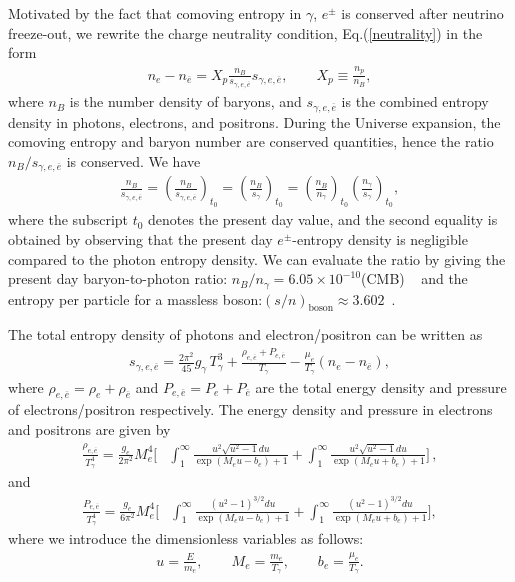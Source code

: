 Motivated by the fact that comoving entropy in $\gamma$, $e^\pm$ is conserved after neutrino freeze-out, we rewrite the charge neutrality condition, Eq.(\ref{neutrality}) in the form
\begin{align}\label{charge_neutral_cond2}
n_e-n_{\overline{e}}=X_p\frac{n_B}{s_{\gamma,e,\overline{e}}} s_{\gamma,e,\overline{e}},\qquad X_p\equiv\frac{n_p}{n_B},
\end{align}
where $n_B$ is the number density of baryons, and $s_{\gamma,e,\overline{e}}$ is the combined entropy density in photons, electrons, and positrons. During the Universe expansion, the comoving entropy and baryon number are conserved quantities, hence the ratio $n_B/s_{\gamma,e,\overline{e}}$ is conserved. We have
\begin{align}
\frac{n_B}{s_{\gamma,e,\overline{e}}}=\left(\frac{n_B}{s_{\gamma,e,\overline{e}}}\right)_{t_0}\!\!\!\!=\left(\frac{n_B}{s_{\gamma}}\right)_{t_0}\!\!\!\!=\left(\frac{n_B}{n_\gamma}\right)_{t_0}\left(\frac{n_\gamma}{s_{\gamma}}\right)_{t_0},
\end{align}
where the subscript $t_0$ denotes the present day value, and the second equality is obtained by observing that the present day $e^\pm$-entropy density is negligible compared to the photon entropy density. We can evaluate the ratio by giving the present day baryon-to-photon ratio: $n_B/n_\gamma= 6.05\times10^{-10}$(CMB) ~\cite{ParticleDataGroup:2022pth} and the entropy per particle for a massless boson:$(s/n)_{\mathrm{boson}}\approx 3.602$~\cite{Letessier:2002ony}.

The total entropy density of photons and electron/positron can be written as
\begin{align}\label{entropy_per_baryon}
s_{\gamma,e,\overline{e}}=\frac{2\pi^2}{45}g_\gamma\,T_\gamma^3+\frac{\rho_{e,\overline{e}}+P_{e,\overline{e}}}{T_\gamma}-\frac{\mu_e}{T_\gamma}(n_e-n_{\overline{e}}),
\end{align}
where $ \rho_{e,\overline{e}}=\rho_{e}+\rho_{\overline{e}}$ and $P_{e,\overline{e}}=P_{e}+P_{\overline{e}}$ are the total energy density and pressure of electrons/positron respectively.
The energy density and pressure in electrons and positrons are given by
\begin{align}\label{rho_e}
\frac{\rho_{e,\overline{e}}}{T_\gamma^4}=\frac{g_e}{2\pi^2}M_e^4 \bigg[&\int_{1}^\infty \frac{ u^2\sqrt{ u^2-1} du}{\exp(M_e u-b_e)+1}+\int_{1}^\infty \frac{ u^2\sqrt{ u^2-1} du}{\exp(M_e u+b_e)+1}\bigg]\,,
\end{align}
and
\begin{align}\label{P_e}
\frac{P_{e,\overline{e}}}{T_\gamma^4}=\frac{g_e}{6\pi^2}M_e^4\bigg[&\int_{1}^\infty   \frac{(u^2-1)^{3/2} du}{\exp(M_e u-b_e)+1}+\int_{1}^\infty   \frac{(u^2-1)^{3/2} du}{\exp(M_e u+b_e)+1}\bigg],
\end{align}
where we introduce the dimensionless variables as follows: 
\begin{align}\label{Variables}
u=\frac{E}{m_e},\qquad M_e=\frac{m_e}{T_\gamma},\qquad b_e=\frac{\mu_e}{T_\gamma}.
\end{align}

